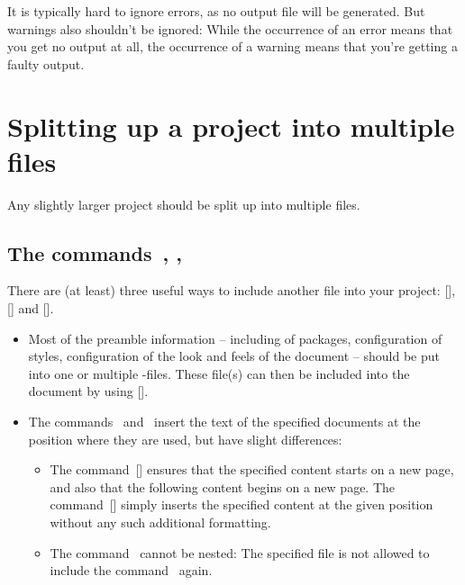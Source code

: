It is typically hard to ignore errors, as no output file will be generated.
But warnings also shouldn’t be ignored:
While the occurrence of an error means that you get no output at all, the occurrence of a warning means that you’re getting a faulty output.






\section{Splitting up a project into multiple files}

Any slightly larger project should be split up into multiple files.



\subsection{The commands~, , }

There are (at least) three useful ways to include another file into your project: [\comname], [\comname] and [\comname].
\begin{itemize}[leftmargin=*]
  \item
    Most of the preamble information -- including of packages, configuration of styles, configuration of the look and feels of the document -- should be put into one or multiple -files.
    These file(s) can then be included into the document by using [\comname].
  \item
    The commands~ and~ insert the text of the specified documents at the position where they are used, but have slight differences:
    \begin{itemize}[label = \textopenbullet, leftmargin=*]
      \item
        The command~[\comname] ensures that the specified content starts on a new page, and also that the following content begins on a new page.
        The command~[\comname] simply inserts the specified content at the given position without any such additional formatting.
      \item
        The command~ cannot be nested:
        The specified file is not allowed to include the command~ again.
    \end{itemize}
\end{itemize}

